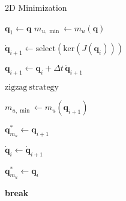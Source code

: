 \begin{algorithm}[H]
	\caption{2D Minimization}
	\label{alg:2D_alg}
	\begin{algorithmic}[1]
		\State $\mathbf{q}_1 \leftarrow \mathbf{q}$
		\State $m_{u,\min} \leftarrow m_u(\mathbf{q})$
		
%		
		
		
		\State $\dot{\mathbf{q}}_{i+1} \leftarrow \mathrm{select}(\mathrm{ker}(J(\mathbf{q}_i)))$ \label{2D_alg:line:select}
		
		
		\State $\mathbf{q}_{i+1} \leftarrow \mathbf{q}_i + \Delta t \, \dot{\mathbf{q}}_{i+1}$
		
	\State $\mathrm{zigzag \ strategy}$ \label{2D_alg:line:zigzag}
		
		
		\State $m_{u,\min} \leftarrow m_u(\mathbf{q}_{i+1})$
		
		\State $\mathbf{q}_{m_u}^\ast \leftarrow \mathbf{q}_{i+1}$
		
		\State $\dot{\mathbf{q}}_{i} \leftarrow \dot{\mathbf{q}}_{i+1}$
		
		\Else
		
		\State $\mathbf{q}_{m_u}^\ast \leftarrow \mathbf{q}_{i}$		
		
		\State \textbf{break}
		\EndIf

%		
%		
%		
%		
%		
%		
		\EndFor
	\end{algorithmic}
\end{algorithm}












